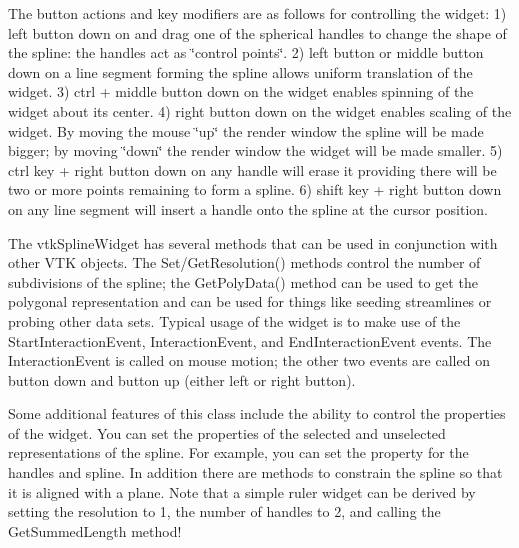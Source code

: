 The button actions and key modifiers are as follows for controlling the widget\-: 1) left button down on and drag one of the spherical handles to change the shape of the spline\-: the handles act as \char`\"{}control points\char`\"{}. 2) left button or middle button down on a line segment forming the spline allows uniform translation of the widget. 3) ctrl + middle button down on the widget enables spinning of the widget about its center. 4) right button down on the widget enables scaling of the widget. By moving the mouse \char`\"{}up\char`\"{} the render window the spline will be made bigger; by moving \char`\"{}down\char`\"{} the render window the widget will be made smaller. 5) ctrl key + right button down on any handle will erase it providing there will be two or more points remaining to form a spline. 6) shift key + right button down on any line segment will insert a handle onto the spline at the cursor position.

The vtk\-Spline\-Widget has several methods that can be used in conjunction with other V\-T\-K objects. The Set/\-Get\-Resolution() methods control the number of subdivisions of the spline; the Get\-Poly\-Data() method can be used to get the polygonal representation and can be used for things like seeding streamlines or probing other data sets. Typical usage of the widget is to make use of the Start\-Interaction\-Event, Interaction\-Event, and End\-Interaction\-Event events. The Interaction\-Event is called on mouse motion; the other two events are called on button down and button up (either left or right button).

Some additional features of this class include the ability to control the properties of the widget. You can set the properties of the selected and unselected representations of the spline. For example, you can set the property for the handles and spline. In addition there are methods to constrain the spline so that it is aligned with a plane. Note that a simple ruler widget can be derived by setting the resolution to 1, the number of handles to 2, and calling the Get\-Summed\-Length method!

